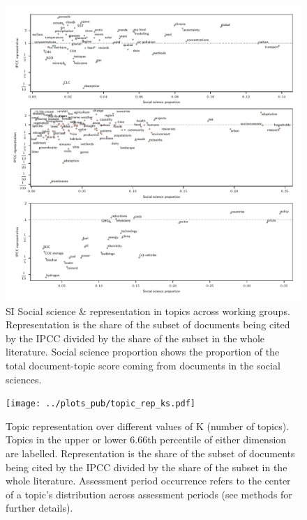 \documentclass{article}
\begin{document}
\begin{figure}
	\begin{center}
		\includegraphics[width=1\linewidth]{../plots_pub/wgs_socsci.pdf}
		\caption{SI Social science \& representation in topics across working groups. Representation is the share of the subset of documents being cited by the IPCC divided by the share of the subset in the whole literature. Social science proportion shows the proportion of the total document-topic score coming from documents in the social sciences.}
		\label{socsci-wgs}
	\end{center}
\end{figure}

\begin{figure}
	\begin{center}
		\texttt{[image: ../plots\_pub/topic\_rep\_ks.pdf]}
		\caption{Topic representation over different values of K (number of topics). Topics in the upper or lower 6.66th percentile of either dimension are labelled. Representation is the share of the subset of documents being cited by the IPCC divided by the share of the subset in the whole literature. Assessment period occurrence refers to the center of a topic's distribution across assessment periods (see methods for further details).}
		\label{top-rep-ks}
	\end{center}
\end{figure}
\end{document}

